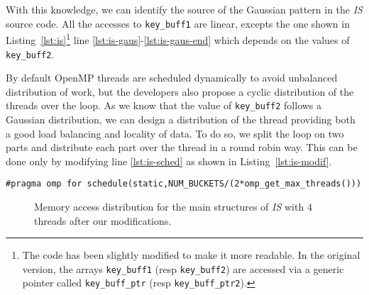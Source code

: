 

With this knowledge, we can identify the source of the
Gaussian pattern in the \emph{IS} source code. All the accesses to \texttt{key\_buff1} are linear,
excepts the one shown in Listing~\ref{lst:is}\footnote{
    The code has been slightly modified to make it more readable. In the
    original version, the arrays \texttt{key\_buff1} (resp \texttt{key\_buff2})
    are accessed via a generic pointer called \texttt{key\_buff\_ptr} (resp
    \texttt{key\_buff\_ptr2}).
}  line \ref{lst:is-gaus}-\ref{lst:is-gaus-end} which depends on the values of
\texttt{key\_buff2}.

By default OpenMP threads are scheduled dynamically to avoid unbalanced
distribution of work, but the developers also propose a cyclic distribution
of the threads over the loop. As we know that the value of \texttt{key\_buff2}
follows a Gaussian distribution, we can design a distribution of the thread
providing both a good load balancing and locality of data. To do  so, we split
the loop on two parts and distribute each part over the thread in a round
robin way. This can be done only by modifying line \ref{lst:is-sched} as shown
in Listing~\ref{lst:is-modif}.

\begin{lstlisting}[float=htb,caption=Optimization for \emph{IS}., label=lst:is-modif]
#pragma omp for schedule(static,NUM_BUCKETS/(2*omp_get_max_threads()))
\end{lstlisting}

\begin{figure}[htb]
    \centering


    \caption{Memory access distribution for the main structures of
        \emph{IS} with $4$ threads after our modifications.}
    \label{fig:is-behaviour-modif}
\end{figure}

